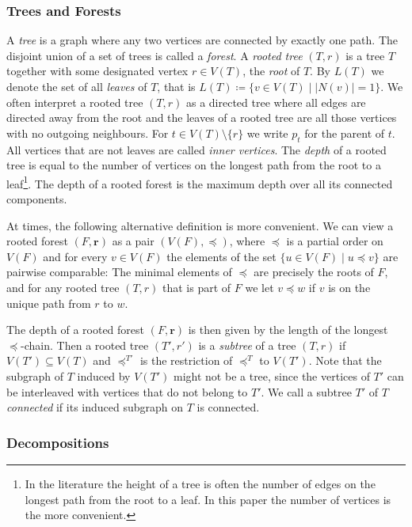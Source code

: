 \documentclass{lmcs}
\theoremstyle{plain}\newtheorem{claim}[thm]{Claim}   %
\newcommand{\tup}[1]{\ensuremath{\boldsymbol{#1}}}
\begin{document}
\subsubsection{Trees and Forests}
A \emph{tree} is a graph where any two vertices are connected by exactly one path.
The disjoint union of a set of trees is called a \emph{forest}.
A \emph{rooted tree} $(T, r)$ is a tree $T$ together with some designated vertex $r \in V(T)$, the \emph{root} of $T$.
By \(L(T)\) we denote the set of all \emph{leaves} of \(T\), that is \(L(T)\coloneqq\{ v\in V(T) \mid |N(v)|=1\}\).
We often interpret a rooted tree $(T,r)$ as a directed tree where all edges are directed away from the root and the leaves of a rooted tree are all those vertices with no outgoing neighbours.
For $t\in V(T)\setminus\{r\}$ we write $p_t$ for the parent of $t$.
All vertices that are not leaves are called \emph{inner vertices}.
The \emph{depth} of a rooted tree is equal to the number of vertices on the longest path from the root to a leaf\footnote{In the literature the height of a tree is often the number of edges on the longest path from the root to a leaf. In this paper the number of vertices is the more convenient.}.
The depth of a rooted forest is the maximum depth over all its connected components.

At times, the following alternative definition is more convenient.
We can view a rooted forest $(F, \tup{r})$ as a pair $(V(F), \preceq)$, where $\preceq$ is a partial order on $V(F)$ and for every $v \in V(F)$ the elements of the set $\{u \in V(F) \mid u \preceq v\}$ are pairwise comparable: The minimal elements of $\preceq$ are precisely the roots of $F$, and for any rooted tree $(T, r)$ that is part of $F$ we let $v \preceq w$ if $v$ is on the unique path from $r$ to $w$.

The depth of a rooted forest $(F, \tup{r})$ is then given by the length of the longest $\preceq$-chain.
Then a rooted tree $(T', r')$ is a \emph{subtree} of a tree $(T, r)$ if $V(T') \subseteq V(T)$ and $\preceq^{T'}$ is the restriction of $\preceq^T$ to $V(T')$.
Note that the subgraph of $T$ induced by $V(T')$ might not be a tree, since the vertices of $T'$ can be interleaved with vertices that do not belong to $T'$.
We call a subtree $T'$ of $T$ \emph{connected} if its induced subgraph on $T$ is connected.

\subsubsection{Decompositions}
\end{document}

